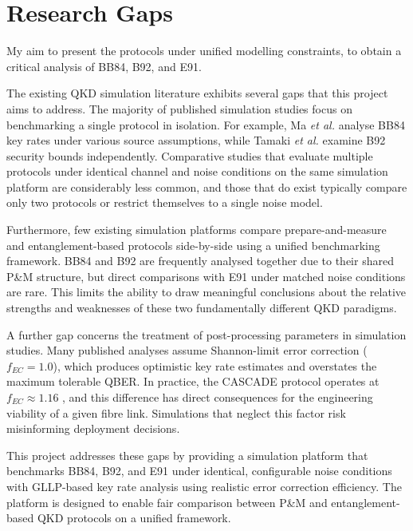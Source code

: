 \documentclass[10pt, a4paper]{report}
\begin{document}
\section{Research Gaps}
My aim to present the protocols under unified modelling constraints, to obtain a critical analysis of BB84, B92, and E91.

The existing QKD simulation literature exhibits several gaps that this project aims to address. The majority of published simulation studies focus on benchmarking a single protocol in isolation. For example, Ma \textit{et al.} \cite{Ma2005} analyse BB84 key rates under various source assumptions, while Tamaki \textit{et al.} \cite{Tamaki2014} examine B92 security bounds independently. Comparative studies that evaluate multiple protocols under identical channel and noise conditions on the same simulation platform are considerably less common, and those that do exist typically compare only two protocols or restrict themselves to a single noise model.

Furthermore, few existing simulation platforms compare prepare-and-measure and entanglement-based protocols side-by-side using a unified benchmarking framework. BB84 and B92 are frequently analysed together due to their shared P\&M structure, but direct comparisons with E91 under matched noise conditions are rare. This limits the ability to draw meaningful conclusions about the relative strengths and weaknesses of these two fundamentally different QKD paradigms.

A further gap concerns the treatment of post-processing parameters in simulation studies. Many published analyses assume Shannon-limit error correction ($f_{EC} = 1.0$), which produces optimistic key rate estimates and overstates the maximum tolerable QBER. In practice, the CASCADE protocol operates at $f_{EC} \approx 1.16$ \cite{Cascade1994}, and this difference has direct consequences for the engineering viability of a given fibre link. Simulations that neglect this factor risk misinforming deployment decisions.

This project addresses these gaps by providing a simulation platform that benchmarks BB84, B92, and E91 under identical, configurable noise conditions with GLLP-based key rate analysis using realistic error correction efficiency. The platform is designed to enable fair comparison between P\&M and entanglement-based QKD protocols on a unified framework.




\end{document}
